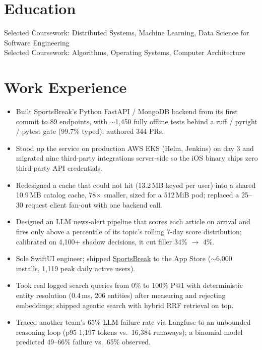 \documentclass[11pt, letterpaper]{article}
\begin{document}

\section{Education}
Selected Coursework: Distributed Systems, Machine Learning, Data Science for Software Engineering\\[1pt]
Selected Coursework: Algorithms, Operating Systems, Computer Architecture

\section{Work Experience}
\begin{itemize}
  \item Built SportsBreak's Python FastAPI / MongoDB backend from its first commit to 89 endpoints, with $\sim$1{,}450 fully offline tests behind a ruff / pyright / pytest gate (99.7\% typed); authored 344 PRs.
  \item Stood up the service on production AWS EKS (Helm, Jenkins) on day 3 and migrated nine third-party integrations server-side so the iOS binary ships zero third-party API credentials.
  \item Redesigned a cache that could not hit (13.2\,MB keyed per user) into a shared 10.9\,MB catalog cache, 78$\times$ smaller, sized for a 512\,MiB pod; replaced a 25--30 request client fan-out with one backend call.
  \item Designed an LLM news-alert pipeline that scores each article on arrival and fires only above a percentile of its topic's rolling 7-day score distribution; calibrated on 4{,}100+ shadow decisions, it cut filler 34\% $\to$ 4\%.
  \item Sole SwiftUI engineer; shipped \href{https://apps.apple.com/app/id6762649287}{SportsBreak} to the App Store ($\sim$6{,}000 installs, 1{,}119 peak daily active users).
  \item Took real logged search queries from 0\% to 100\% P@1 with deterministic entity resolution (0.4\,ms, 206 entities) after measuring and rejecting embeddings; shipped agentic search with hybrid RRF retrieval on top.
  \item Traced another team's 65\% LLM failure rate via Langfuse to an unbounded reasoning loop (p95 1{,}197 tokens vs.\ 16{,}384 runaways); a binomial model predicted 49--66\% failure vs.\ 65\% observed.
\end{itemize}
\end{document}
